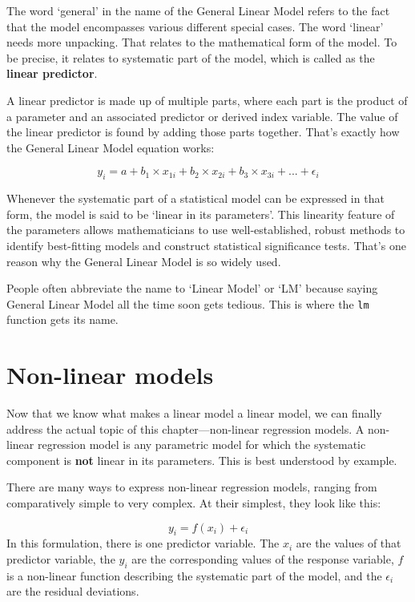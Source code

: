 \documentclass[
]{book}
\begin{document}
The word `general' in the name of the General Linear Model refers to the fact that the model encompasses various different special cases. The word `linear' needs more unpacking. That relates to the mathematical form of the model. To be precise, it relates to systematic part of the model, which is called as the \textbf{linear predictor}.

A linear predictor is made up of multiple parts, where each part is the product of a parameter and an associated predictor or derived index variable. The value of the linear predictor is found by adding those parts together. That's exactly how the General Linear Model equation works:

\[y_i = a + b_1 \times x_{1i} + b_2 \times x_{2i} + b_3 \times x_{3i} + ... + \epsilon_i\]

Whenever the systematic part of a statistical model can be expressed in that form, the model is said to be `linear in its parameters'. This linearity feature of the parameters allows mathematicians to use well-established, robust methods to identify best-fitting models and construct statistical significance tests. That's one reason why the General Linear Model is so widely used.

People often abbreviate the name to `Linear Model' or `LM' because saying General Linear Model all the time soon gets tedious. This is where the \texttt{lm} function gets its name.

\hypertarget{non-linear-models}{%
\section{Non-linear models}\label{non-linear-models}}

Now that we know what makes a linear model a linear model, we can finally address the actual topic of this chapter---non-linear regression models. A non-linear regression model is any parametric model for which the systematic component is \textbf{not} linear in its parameters. This is best understood by example.

There are many ways to express non-linear regression models, ranging from comparatively simple to very complex. At their simplest, they look like this:

\[y_i = f(x_i) + \epsilon_i\]
In this formulation, there is one predictor variable. The \(x_i\) are the values of that predictor variable, the \(y_i\) are the corresponding values of the response variable, \(f\) is a non-linear function describing the systematic part of the model, and the \(\epsilon_i\) are the residual deviations.
\end{document}
